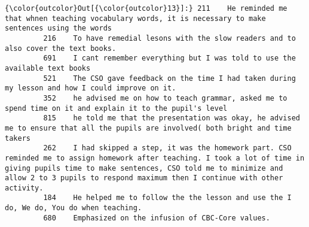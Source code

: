 \documentclass[11pt]{article}
\begin{document}
\begin{Verbatim}[commandchars=\\\{\}]
{\color{outcolor}Out[{\color{outcolor}13}]:} 211    He reminded me that whnen teaching vocabulary words, it is necessary to make sentences using the words                                                                                                                                                                  
         216    To have remedial lesons with the slow readers and to also cover the text books.                                                                                                                                                                                         
         691    I cant remember everything but I was told to use the available text books                                                                                                                                                                                               
         521    The CSO gave feedback on the time I had taken during my lesson and how I could improve on it.                                                                                                                                                                           
         352    he advised me on how to teach grammar, asked me to spend time on it and explain it to the pupil's level                                                                                                                                                                 
         815    he told me that the presentation was okay, he advised me to ensure that all the pupils are involved( both bright and time takers                                                                                                                                        
         262    I had skipped a step, it was the homework part. CSO reminded me to assign homework after teaching. I took a lot of time in giving pupils time to make sentences, CSO told me to minimize and allow 2 to 3 pupils to respond maximum then I continue with other activity.
         184    He helped me to follow the the lesson and use the I do, We do, You do when teaching.                                                                                                                                                                                    
         680    Emphasized on the infusion of CBC-Core values.                                                                                                                                                                                                                          

\end{Verbatim}
\end{document}

